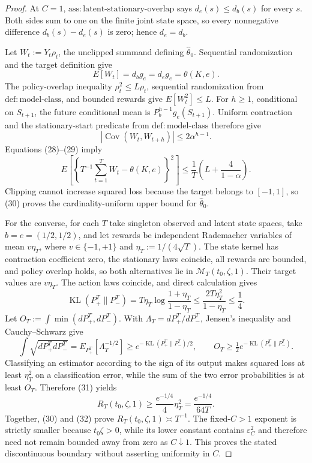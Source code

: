 \documentclass{article}
\begin{document}
\begin{proof}
At \(C=1\), \(\mathrm{ass{:}latent\text{-}stationary\text{-}overlap}\) says \(d_e(s)\le d_b(s)\) for every \(s\).  Both sides sum to one on the finite joint state space, so every nonnegative difference \(d_b(s)-d_e(s)\) is zero; hence \(d_e=d_b\).

Let \(W_t:=Y_t\rho_t\), the unclipped summand defining \(\widehat\theta_0\).  Sequential randomization and the target definition give
\[
 E[W_t]=d_bg_e=d_eg_e=\theta(K,e). \tag{28}
\]
The policy-overlap inequality \(\rho_t^2\le L\rho_t\), sequential randomization from \(\mathrm{def{:}model\text{-}class}\), and bounded rewards give \(E[W_t^2]\le L\).  For \(h\ge1\), conditional on \(S_{t+1}\), the future conditional mean is \(P_b^{h-1}g_e(S_{t+1})\).  Uniform contraction and the stationary-start predicate from \(\mathrm{def{:}model\text{-}class}\) therefore give
\[
 |\operatorname{Cov}(W_t,W_{t+h})|\le2\alpha^{h-1}. \tag{29}
\]
Equations (28)--(29) imply
\[
 E\!\left[\left\{T^{-1}\sum_{t=1}^TW_t-\theta(K,e)\right\}^2\right]
 \le\frac1T\left(L+\frac4{1-\alpha}\right). \tag{30}
\]
Clipping cannot increase squared loss because the target belongs to \([-1,1]\), so (30) proves the cardinality-uniform upper bound for \(\widehat\theta_0\).

For the converse, for each \(T\) take singleton observed and latent state spaces, take \(b=e=(1/2,1/2)\), and let rewards be independent Rademacher variables of mean \(v\eta_T\), where \(v\in\{-1,+1\}\) and \(\eta_T:=1/(4\sqrt T)\).  The state kernel has contraction coefficient zero, the stationary laws coincide, all rewards are bounded, and policy overlap holds, so both alternatives lie in \(\mathcal M_T(t_0,\zeta,1)\).  Their target values are \(v\eta_T\).  The action laws coincide, and direct calculation gives
\[
 \operatorname{KL}(P_+^T\|P_-^T)
 =T\eta_T\log\frac{1+\eta_T}{1-\eta_T}
 \le\frac{2T\eta_T^2}{1-\eta_T}\le\frac14. \tag{31}
\]
Let \(O_T:=\int\min(dP_+^T,dP_-^T)\).  With \(\Lambda_T=dP_+^T/dP_-^T\), Jensen's inequality and Cauchy--Schwarz give
\[
 \int\sqrt{dP_+^TdP_-^T}
 =E_{P_+^T}[\Lambda_T^{-1/2}]
 \ge e^{-\operatorname{KL}(P_+^T\|P_-^T)/2},
 \qquad
 O_T\ge\tfrac12e^{-\operatorname{KL}(P_+^T\|P_-^T)}.
\]
Classifying an estimator according to the sign of its output makes squared loss at least \(\eta_T^2\) on a classification error, while the sum of the two error probabilities is at least \(O_T\).  Therefore (31) yields
\[
 R_T(t_0,\zeta,1)\ge \frac{e^{-1/4}}{4}\eta_T^2
 =\frac{e^{-1/4}}{64T}. \tag{32}
\]
Together, (30) and (32) prove \(R_T(t_0,\zeta,1)\asymp T^{-1}\).  The fixed-\(C>1\) exponent is strictly smaller because \(t_0\zeta>0\), while its lower constant contains \(\varepsilon_C^2\) and therefore need not remain bounded away from zero as \(C\downarrow1\).  This proves the stated discontinuous boundary without asserting uniformity in \(C\).
\end{proof}
\end{document}
